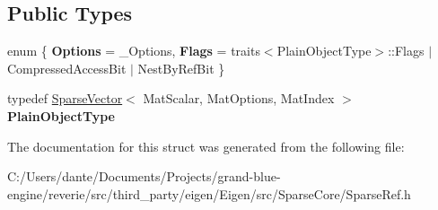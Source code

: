 \subsection*{Public Types}
\begin{DoxyCompactItemize}
\item 
\mbox{\label{struct_eigen_1_1internal_1_1traits_3_01_ref_3_01_sparse_vector_3_01_mat_scalar_00_01_mat_optionsd46b48c0b126a924a96003bc7b99d5a2_a1b78f067c4c05e97aa9a8367e205b2dc}} 
enum \{ {\bfseries Options} = \+\_\+\+Options, 
{\bfseries Flags} = traits$<$Plain\+Object\+Type$>$\+::Flags $\vert$ Compressed\+Access\+Bit $\vert$ Nest\+By\+Ref\+Bit
 \}
\item 
\mbox{\label{struct_eigen_1_1internal_1_1traits_3_01_ref_3_01_sparse_vector_3_01_mat_scalar_00_01_mat_optionsd46b48c0b126a924a96003bc7b99d5a2_aaf4444213ac3f213f1ce25c88f4562e7}} 
typedef \mbox{\hyperlink{class_eigen_1_1_sparse_vector}{Sparse\+Vector}}$<$ Mat\+Scalar, Mat\+Options, Mat\+Index $>$ {\bfseries Plain\+Object\+Type}
\end{DoxyCompactItemize}


The documentation for this struct was generated from the following file\+:\begin{DoxyCompactItemize}
\item 
C\+:/\+Users/dante/\+Documents/\+Projects/grand-\/blue-\/engine/reverie/src/third\+\_\+party/eigen/\+Eigen/src/\+Sparse\+Core/Sparse\+Ref.\+h\end{DoxyCompactItemize}
